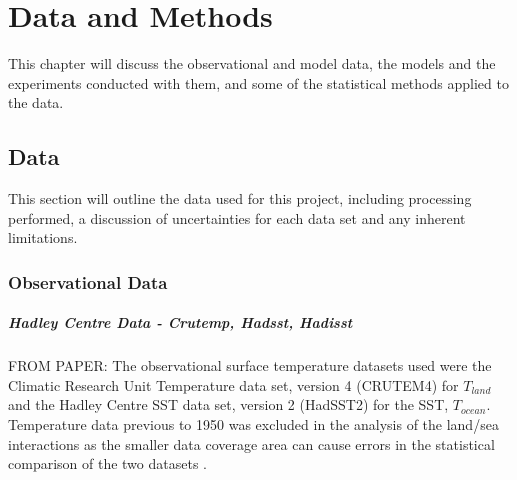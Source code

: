 \chapter{Data and Methods} %

\label{methods} %


This chapter will discuss the observational and model data, the models and the 
experiments conducted with them, and some of the statistical methods applied to 
the data.


\section{Data}

This section will outline the data used for this project, including processing 
performed, a discussion of uncertainties for each data set and any inherent 
limitations.

\subsection{Observational Data}

\paragraph{Hadley Centre Data - Crutemp, Hadsst, Hadisst}
FROM PAPER: The observational surface temperature datasets used were the 
Climatic Research Unit Temperature data set, version 4 (CRUTEM4) 
\citep{Brohan2006} for $T_{land}$ and the Hadley Centre SST data set, version 2 
(HadSST2) \citep{Rayner2006}for the SST, $T_{ocean}$.  Temperature data previous 
to 1950 was excluded in the analysis of the land/sea interactions as the smaller 
data coverage area can cause errors in the statistical comparison of the two 
datasets \citep{Dommenget2009}.

